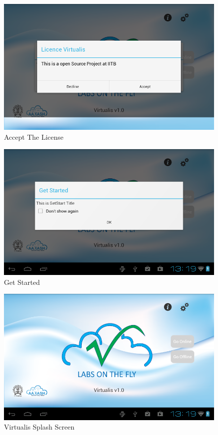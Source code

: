 \documentclass[12pt]{report}
\begin{document}
\pagebreak
\begin{figure}[H]
 \centering
 \includegraphics[width=15cm]{./2.png}
 \caption{Accept The License\label{fig:2}}
\end{figure}

\begin{figure}[H]
 \centering
 \includegraphics[width=15cm]{./3.png}
 \caption{Get Started \label{fig:3}}
\end{figure}

\begin{figure}[H]
 \centering
 \includegraphics[width=15cm]{./4.png}
 \caption{Virtualis Splash Screen\label{fig:4}}
\end{figure}
\end{document}
